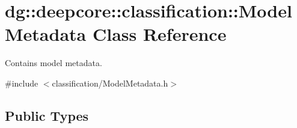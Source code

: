\hypertarget{classdg_1_1deepcore_1_1classification_1_1_model_metadata}{}\section{dg\+:\+:deepcore\+:\+:classification\+:\+:Model\+Metadata Class Reference}
\label{classdg_1_1deepcore_1_1classification_1_1_model_metadata}


Contains model metadata.  




{\ttfamily \#include $<$classification/\+Model\+Metadata.\+h$>$}

\subsection*{Public Types}
